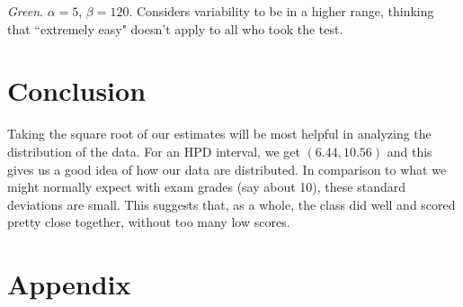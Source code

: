 \documentclass[12pt]{article}
\begin{document}
\noindent \textit{Green}. $\alpha=5$, $\beta=120$.  Considers variability to be in a higher range, thinking that ``extremely easy" doesn't apply to all who took the test.

\section*{Conclusion}

Taking the square root of our estimates will be most helpful in analyzing the distribution of the data.  For an HPD interval, we get $(6.44, 10.56)$ and this gives us a good idea of how our data are distributed.  In comparison to what we might normally expect with exam grades (say about 10), these standard deviations are small.  This suggests that, as a whole, the class did well and scored pretty close together, without too many low scores.

\newpage

\section*{Appendix}
\end{document}
